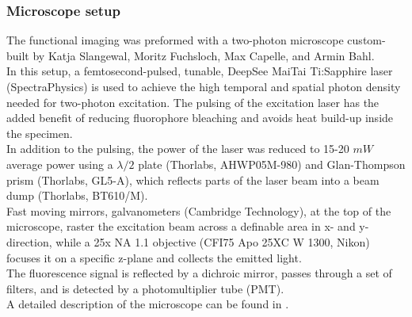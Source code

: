 \documentclass[12pt, a4paper, oneside]{article}
\begin{document}
\subsubsection{Microscope setup}
The functional imaging was preformed with a two-photon microscope custom-built by Katja Slangewal, Moritz Fuchsloch, Max Capelle, and Armin Bahl.\\
In this setup, a femtosecond-pulsed, tunable, DeepSee MaiTai Ti:Sapphire laser (SpectraPhysics) is used to achieve the high temporal and spatial photon density needed for two-photon excitation. The pulsing of the excitation laser has the added benefit of reducing fluorophore bleaching and avoids heat build-up inside the specimen.\\
In addition to the pulsing, the power of the laser was reduced to 15-20 $mW$ average power using a $\lambda/2$ plate  (Thorlabs, AHWP05M-980) and Glan-Thompson prism (Thorlabs, GL5-A), which reflects parts of the laser beam into a beam dump (Thorlabs, BT610/M).\\
Fast moving mirrors, galvanometers (Cambridge Technology), at the top of the microscope, raster the excitation beam across a definable area in  x- and y-direction, while a 25x NA 1.1 objective (CFI75 Apo 25XC W 1300, Nikon) focuses it on a specific z-plane and collects the emitted light.\\
The fluorescence signal is reflected by a dichroic mirror, passes through a set of filters, and is detected by a photomultiplier tube (PMT).\\
A detailed description of the microscope can be found in \cite{slangewalMultifeatureVisualProcessing2026}.\\
\end{document}
